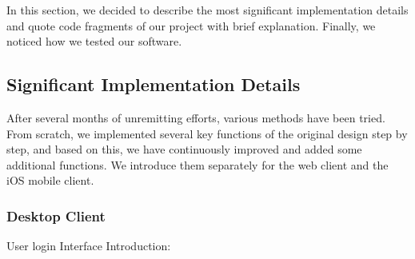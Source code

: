 \noindent In this section, we decided to describe the most significant implementation details and quote code fragments of our project with brief explanation. Finally, we noticed how we tested our software.

\subsection{Significant Implementation Details}
\noindent After several months of unremitting efforts, various methods have been tried. From scratch, we implemented several key functions of the original design step by step, and based on this, we have continuously improved and added some additional functions. We introduce them separately for the web client and the iOS mobile client.
\subsubsection{Desktop Client}
\noindent User login Interface Introduction:
